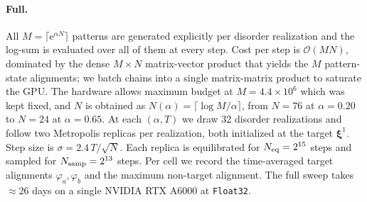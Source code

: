 \documentclass[letterpaper]{article} %
\newcommand{\bxi}{\boldsymbol{\xi}}
\newcommand{\e}{{\mathrm{e}}}
\begin{document}
\paragraph{Full.}
All $M = \lceil\e^{\alpha N}\rceil$ patterns are generated explicitly per
disorder realization and the log-sum is evaluated over all of them at
every step. Cost per step is $\mathcal{O}(MN)$, dominated by the dense 
$M \times N$ matrix-vector product that yields the $M$ pattern-state alignments;
we batch chains into a single matrix-matrix product to saturate the GPU. 
The hardware allows maximum budget at
$M = 4.4 \times 10^6$ which was kept fixed, and $N$ is obtained as
$N(\alpha) = \lceil \log M / \alpha \rceil$, from
$N = 76$ at $\alpha = 0.20$ to $N = 24$ at $\alpha = 0.65$.  At each
$(\alpha, T)$ we draw 32 disorder realizations and follow two Metropolis
replicas per realization, both initialized at the target $\bxi^1$.  Step
size is $\sigma = 2.4\, T / \sqrt N$.  Each replica is equilibrated for
$N_{\rm eq} = 2^{15}$ steps and sampled for $N_{\rm samp} = 2^{13}$
steps.  Per cell we record the time-averaged target alignments
$\varphi_a, \varphi_b$ and the maximum non-target alignment.
The full sweep takes $\approx 26$ days on a single NVIDIA RTX A6000 at \texttt{Float32}.
\end{document}
